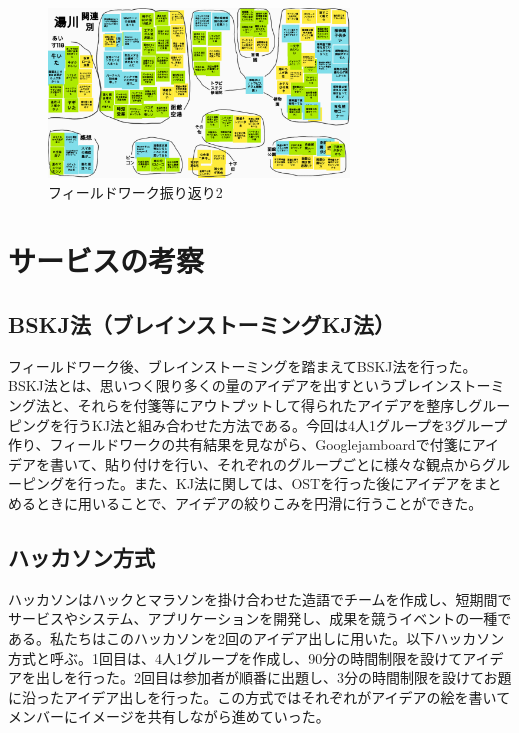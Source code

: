 \begin{figure}[htbp]
    \begin{center}
    \includegraphics[width=8cm]{images/FW2.png}
    \end{center}
    \caption{フィールドワーク振り返り2}
    \label{fig:furikaeri2}
\end{figure}


\section{サービスの考察}

\subsection{BSKJ法（ブレインストーミングKJ法）}
フィールドワーク後、ブレインストーミングを踏まえてBSKJ法を行った。BSKJ法とは、思いつく限り多くの量のアイデアを出すというブレインストーミング法と、それらを付箋等にアウトプットして得られたアイデアを整序しグルーピングを行うKJ法と組み合わせた方法である。今回は4人1グループを3グループ作り、フィールドワークの共有結果を見ながら、Googlejamboardで付箋にアイデアを書いて、貼り付けを行い、それぞれのグループごとに様々な観点からグルーピングを行った。また、KJ法に関しては、OSTを行った後にアイデアをまとめるときに用いることで、アイデアの絞りこみを円滑に行うことができた。

\subsection{ハッカソン方式}
ハッカソンはハックとマラソンを掛け合わせた造語でチームを作成し、短期間でサービスやシステム、アプリケーションを開発し、成果を競うイベントの一種である。私たちはこのハッカソンを2回のアイデア出しに用いた。以下ハッカソン方式と呼ぶ。1回目は、4人1グループを作成し、90分の時間制限を設けてアイデアを出しを行った。2回目は参加者が順番に出題し、3分の時間制限を設けてお題に沿ったアイデア出しを行った。この方式ではそれぞれがアイデアの絵を書いてメンバーにイメージを共有しながら進めていった。


